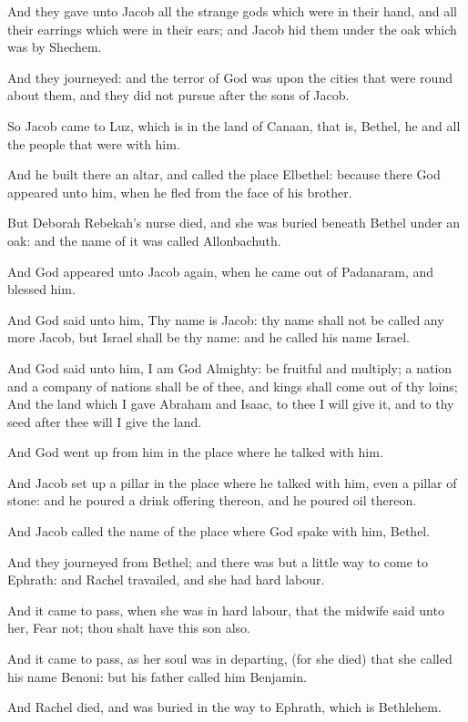\verse And they gave unto Jacob all the strange gods which were in their hand, and all their earrings which were in their ears; and Jacob hid them under the oak which was by Shechem.

\verse And they journeyed: and the terror of God was upon the cities that were round about them, and they did not pursue after the sons of Jacob.

\verse So Jacob came to Luz, which is in the land of Canaan, that is, Bethel, he and all the people that were with him.

\verse And he built there an altar, and called the place Elbethel: because there God appeared unto him, when he fled from the face of his brother.

\verse But Deborah Rebekah's nurse died, and she was buried beneath Bethel under an oak: and the name of it was called Allonbachuth.

\verse And God appeared unto Jacob again, when he came out of Padanaram, and blessed him.

\verse And God said unto him, Thy name is Jacob: thy name shall not be called any more Jacob, but Israel shall be thy name: and he called his name Israel.

\verse And God said unto him, I am God Almighty: be fruitful and multiply; a nation and a company of nations shall be of thee, and kings shall come out of thy loins; \verse And the land which I gave Abraham and Isaac, to thee I will give it, and to thy seed after thee will I give the land.

\verse And God went up from him in the place where he talked with him.

\verse And Jacob set up a pillar in the place where he talked with him, even a pillar of stone: and he poured a drink offering thereon, and he poured oil thereon.

\verse And Jacob called the name of the place where God spake with him, Bethel.

\verse And they journeyed from Bethel; and there was but a little way to come to Ephrath: and Rachel travailed, and she had hard labour.

\verse And it came to pass, when she was in hard labour, that the midwife said unto her, Fear not; thou shalt have this son also.

\verse And it came to pass, as her soul was in departing, (for she died) that she called his name Benoni: but his father called him Benjamin.

\verse And Rachel died, and was buried in the way to Ephrath, which is Bethlehem.

